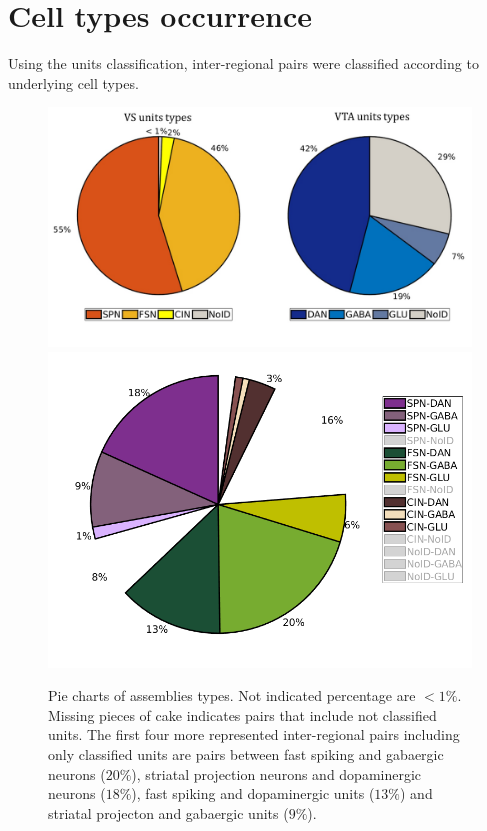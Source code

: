 \section{Cell types occurrence}
Using the units classification, inter-regional pairs were classified according to underlying cell types. 
\begin{figure}
    \centering
    \includegraphics[scale=0.6]{figures/PieRegions1.pdf}
    \includegraphics[scale=0.5]{figures/PieAssembliesTot1.png}
    \caption{Pie charts of assemblies types. Not indicated percentage are $<1\%$. Missing pieces of cake indicates pairs that include not classified units. The first four more represented inter-regional pairs including only classified units are pairs between fast spiking and gabaergic neurons ($20\%$), striatal projection neurons and dopaminergic neurons ($18\%$), fast spiking and dopaminergic units ($13\%$) and striatal projecton and gabaergic units ($9\%$). }
    \label{fig:PieAssembliesTot}
\end{figure}
